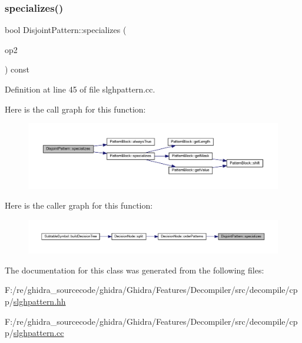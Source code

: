 \subsubsection{\texorpdfstring{specializes()}{specializes()}}
{\footnotesize\ttfamily bool Disjoint\+Pattern\+::specializes (\begin{DoxyParamCaption}\item[{const \mbox{\hyperlink{class_disjoint_pattern}{Disjoint\+Pattern}} $\ast$}]{op2 }\end{DoxyParamCaption}) const}



Definition at line 45 of file slghpattern.\+cc.

Here is the call graph for this function\+:
\nopagebreak
\begin{figure}[H]
\begin{center}
\leavevmode
\includegraphics[width=350pt]{class_disjoint_pattern_a02be45ccd4e176e0ec68fc95a622e820_cgraph}
\end{center}
\end{figure}
Here is the caller graph for this function\+:
\nopagebreak
\begin{figure}[H]
\begin{center}
\leavevmode
\includegraphics[width=350pt]{class_disjoint_pattern_a02be45ccd4e176e0ec68fc95a622e820_icgraph}
\end{center}
\end{figure}


The documentation for this class was generated from the following files\+:\begin{DoxyCompactItemize}
\item 
F\+:/re/ghidra\+\_\+sourcecode/ghidra/\+Ghidra/\+Features/\+Decompiler/src/decompile/cpp/\mbox{\hyperlink{slghpattern_8hh}{slghpattern.\+hh}}\item 
F\+:/re/ghidra\+\_\+sourcecode/ghidra/\+Ghidra/\+Features/\+Decompiler/src/decompile/cpp/\mbox{\hyperlink{slghpattern_8cc}{slghpattern.\+cc}}\end{DoxyCompactItemize}
